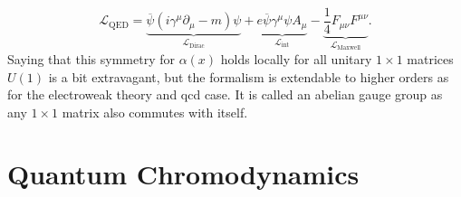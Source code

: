 \begin{equation}
    \mathcal{L}_\mathrm{QED}
    =
    \underbrace{\overline{\psi}(i \gamma^\mu \partial_\mu - m )\psi}_{\mathcal{L}_\mathrm{Dirac} }
    +
    \underbrace{ e\overline{\psi} \gamma^\mu {\psi}A_\mu}_{\mathcal{L}_\mathrm{int}}
    -
    \underbrace{\frac{1}{4}F_{\mu\nu}F^{\mu\nu}}_{\mathcal{L}_\mathrm{Maxwell} }.
    \label{eq:l_qed}
\end{equation}
Saying that this symmetry for $\alpha(x)$ holds locally for all unitary $1\times1$  matrices $U(1)$ is a bit extravagant, but the formalism is extendable to higher orders as for the electroweak theory and \ac{qcd} case. It is called an abelian gauge group as any $1\times1$ matrix also commutes with itself.

\section{Quantum Chromodynamics}

